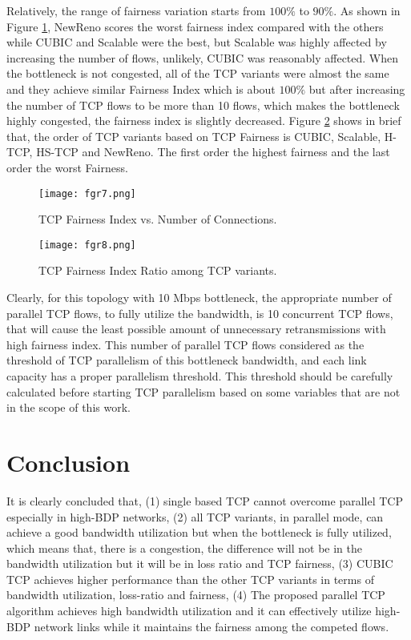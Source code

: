 \documentclass[a4paper, conference]{IEEEtran}
\begin{document}
Relatively, the range of fairness variation starts from $100\%$ to $90\%$. As shown in Figure \ref{fairness-index}, NewReno scores the worst fairness index compared with the others while CUBIC and Scalable were the best, but Scalable was highly affected by increasing the number of flows, unlikely, CUBIC was reasonably affected. When the bottleneck is not congested, all of the TCP variants were almost the same and they achieve similar Fairness Index which is about $100\%$ but after increasing the number of TCP flows to be more than 10 flows, which makes the bottleneck highly congested, the fairness index is slightly decreased. Figure \ref{fairness-ratio} shows in brief that, the order of TCP variants based on TCP Fairness is CUBIC, Scalable, H-TCP, HS-TCP and NewReno. The first order the highest fairness and the last order the worst Fairness.

\begin{figure}[h]
\centerline{\texttt{[image: fgr7.png]}}
\caption{TCP Fairness Index vs. Number of Connections.}
\label{fairness-index}
\end{figure}

\begin{figure}[h]
\centerline{\texttt{[image: fgr8.png]}}
\caption{TCP Fairness Index Ratio among TCP variants.}
\label{fairness-ratio}
\end{figure}

Clearly, for this topology with 10 Mbps bottleneck, the appropriate number of parallel TCP flows, to fully utilize the bandwidth, is 10 concurrent TCP flows, that will cause the least possible amount of unnecessary retransmissions with high fairness index. This number of parallel TCP flows considered as the threshold of TCP parallelism of this bottleneck bandwidth, and each link capacity has a proper parallelism threshold. This threshold should be carefully calculated before starting TCP parallelism based on some variables that are not in the scope of this work.

\section{Conclusion}

It is clearly concluded that, (1) single based TCP cannot overcome parallel TCP especially in high-BDP networks, (2) all TCP variants, in parallel mode, can achieve a good bandwidth utilization but when the bottleneck is fully utilized, which means that, there is a congestion, the difference will not be in the bandwidth utilization but it will be in loss ratio and TCP fairness, (3) CUBIC TCP achieves higher performance than the other TCP variants in terms of bandwidth utilization, loss-ratio and fairness, (4) The proposed parallel TCP algorithm achieves high bandwidth utilization and it can effectively utilize high-BDP network links while it maintains the fairness among the competed flows.
\end{document}
